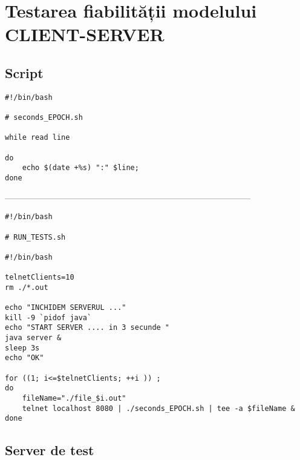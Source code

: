 \appendix
\chapter{Testarea fiabilității modelului CLIENT-SERVER}
\section{Script}

\begin{verbatim}
#!/bin/bash

# seconds_EPOCH.sh

while read line

do
    echo $(date +%s) ":" $line;
done
\end{verbatim}
\par
\par ---------------------------------------------------------------------------------------
\par 
\begin{verbatim}
#!/bin/bash

# RUN_TESTS.sh

#!/bin/bash

telnetClients=10
rm ./*.out

echo "INCHIDEM SERVERUL ..."
kill -9 `pidof java` 
echo "START SERVER .... in 3 secunde "
java server &
sleep 3s
echo "OK" 

for ((1; i<=$telnetClients; ++i )) ; 
do
    fileName="./file_$i.out"
    telnet localhost 8080 | ./seconds_EPOCH.sh | tee -a $fileName &
done
\end{verbatim}

\section{Server de test}

